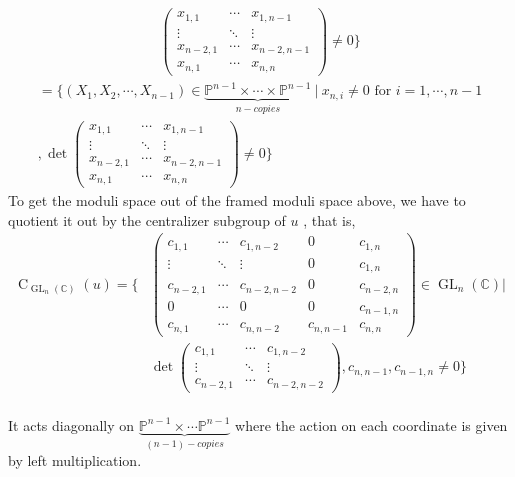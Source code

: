 \begin{example}
\begin{align*}
		\left( \begin{array}{ccc}
			x_{1,1}&\cdots &x_{1,n-1}\\
			\vdots &\ddots & \vdots \\
			x_{n-2,1}&\cdots &x_{n-2,n-1}\\
			x_{n,1}&\cdots & x_{n,n}
		\end{array}\right)
		\neq 0\}
		\end{align*}
		\begin{align*}
=\{(X_1,X_2,\cdots,X_{n-1}) \in\underbrace{\mathbb{P}^{n-1}\times \cdots \times \mathbb{P}^{n-1}}_{n-copies}~|~
		x_{n,i}\neq 0\text{ for } i=1,\cdots, n-1\\
		,
		\operatorname{det}
		\left( \begin{array}{ccc}
			x_{1,1}&\cdots &x_{1,n-1}\\
			\vdots &\ddots & \vdots \\
			x_{n-2,1}&\cdots &x_{n-2,n-1}\\
			x_{n,1}&\cdots & x_{n,n}
		\end{array}\right)
		\neq 0\}
	\end{align*}
To get the moduli space out of the framed moduli space above, we have to quotient it out by the centralizer subgroup of $u$  
, that is,
	\begin{align*}
		\operatorname{C}_{\operatorname{GL}_n(\mathbb{C})}(u) = \{ 
		&\left(\begin{array}{ccc|cc}
			c_{1,1}&\cdots&c_{1,n-2}&0&c_{1,n}\\
			\vdots&\ddots&\vdots&0&c_{1,n}\\
			c_{n-2,1}&\cdots&c_{n-2,n-2}&0&c_{n-2,n}\\
			\hline
			0&\cdots&0&0&c_{n-1,n}\\
			c_{n,1}&\cdots&c_{n,n-2}&c_{n,n-1}&c_{n,n}
		\end{array}\right)\in \operatorname{GL}_{n}(\mathbb{C})|\\
		&\operatorname{det}
		\left(\begin{array}{ccc}
			c_{1,1}&\cdots&c_{1,n-2}\\
			\vdots&\ddots&\vdots\\
			c_{n-2,1}&\cdots&c_{n-2,n-2}
		\end{array}\right),c_{n,n-1},c_{n-1,n}\neq 0\}
	\end{align*}\\
It acts diagonally on $\underbrace{\mathbb{P}^{n-1}\times\cdots\mathbb{P}^{n-1}}_{(n-1)-copies}$ where the action on each coordinate is given by left multiplication. \\

\end{example}
